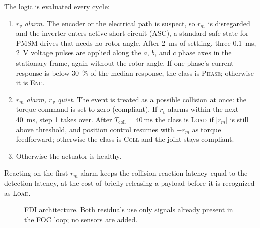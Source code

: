 \documentclass[conference]{IEEEtran}
\begin{document}
The logic is evaluated every cycle:
\begin{enumerate}
  \item \emph{$r_v$ alarm.} The encoder or the electrical path is suspect, so
  $r_m$ is disregarded and the inverter enters active short circuit (ASC), a
  standard safe state for PMSM drives that needs no rotor angle. After
  \SI{2}{\milli\second} of settling, three \SI{0.1}{\milli\second},
  \SI{2}{\volt} voltage pulses are applied along the $a$, $b$, and $c$ phase
  axes in the stationary frame, again without the rotor angle. If one phase's
  current response is below \SI{30}{\percent} of the median response, the
  class is \textsc{Phase}; otherwise it is \textsc{Enc}.
  \item \emph{$r_m$ alarm, $r_v$ quiet.} The event is treated as a possible
  collision at once: the torque command is set to zero (compliant). If $r_v$
  alarms within the next \SI{40}{\milli\second}, step 1 takes over. After
  $T_\mathrm{coll}=\SI{40}{\milli\second}$ the class is \textsc{Load} if
  $|r_m|$ is still above threshold, and position control resumes with $-r_m$
  as torque feedforward; otherwise the class is \textsc{Coll} and the joint
  stays compliant.
  \item Otherwise the actuator is healthy.
\end{enumerate}
Reacting on the first $r_m$ alarm keeps the collision reaction latency equal to
the detection latency, at the cost of briefly releasing a payload before it is
recognized as \textsc{Load}.

\begin{figure}[t]
\centering
{}
\caption{FDI architecture. Both residuals use only signals already present in
the FOC loop; no sensors are added.}
\label{fig:arch}
\end{figure}
\end{document}
